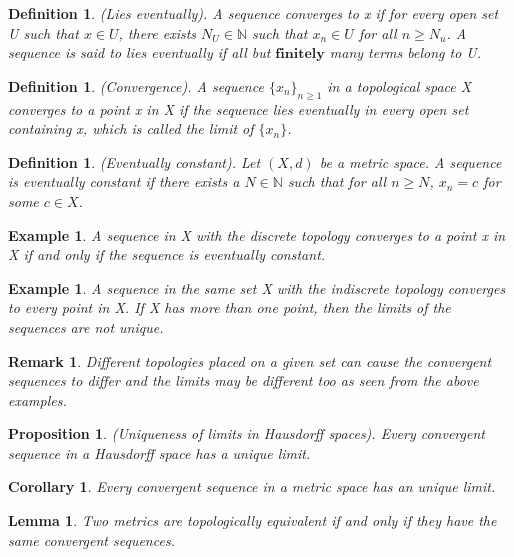 \documentclass[twoside]{article}
\newtheorem{lemma}[theorem]{Lemma}
\newtheorem{proposition}[theorem]{Proposition}
\newtheorem{corollary}[theorem]{Corollary}
\newtheorem{definition}[theorem]{Definition}
\newtheorem{remark}[theorem]{Remark}
\newtheorem{example}[theorem]{Example}
\begin{document}
\begin{definition}(Lies eventually). A sequence converges to x if for every open set U such that $x \in U$, there exists $N_U \in \mathbb{N}$ such that $x_n \in U$ for all $n \geq N_u$. A sequence is said to lies eventually if all but $\textbf{finitely}$ many terms belong to U.
\end{definition}

\begin{definition}(Convergence). A sequence $\{x_n\}_{n \geq 1}$ in a topological space X converges to a point x in X if the sequence lies eventually in every open set containing x, which is called the limit of $\{x_n\}$.
\end{definition}

\begin{definition}(Eventually constant). Let $(X, d)$ be a metric space. A sequence is eventually constant if there exists a $N \in \mathbb{N}$ such that for all $n \geq N$, $x_n = c$ for some $c \in X$.
\end{definition}

\begin{example} A sequence in X with the discrete topology converges to a point x in X if and only if the sequence is eventually constant.
\end{example}

\begin{example} A sequence in the same set X with the indiscrete topology converges to every point in X. If X has more than one point, then the limits of the sequences are not unique.
\end{example}

\begin{remark}Different topologies placed on a given set can cause the convergent sequences to differ and the limits may be different too as seen from the above examples.
\end{remark}

\begin{proposition}(Uniqueness of limits in Hausdorff spaces). Every convergent sequence in a Hausdorff space has a unique limit.
\end{proposition}

\begin{corollary}Every convergent sequence in a metric space has an unique limit.
\end{corollary}

\begin{lemma} Two metrics are topologically equivalent if and only if they have the same convergent sequences.
\end{lemma}
\end{document}
